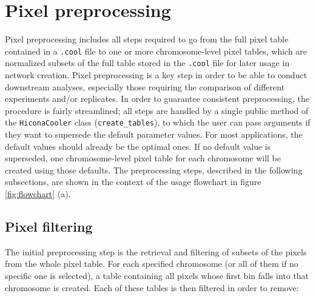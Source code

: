 \section{Pixel preprocessing}
Pixel preprocessing includes all steps required to go from the full pixel table contained in a \texttt{.cool} file to one or more chromosome-level pixel tables, which are normalized subsets of the full table stored in the \texttt{.cool} file for later usage in network creation.  
Pixel preprocessing is a key step in order to be able to conduct downstream analyses, especially those requiring the comparison of different experiments and/or replicates. In order to guarantee consistent preprocessing, the procedure is fairly streamlined; all steps are handled by a single public method of the \texttt{HiconaCooler} class (\texttt{create\_tables}), to which the user can pass arguments if they want to supersede the default parameter values. For most applications, the default values should already be the optimal ones. If no default value is superseded, one chromosome-level pixel table for each chromosome will be created using those defaults. The preprocessing steps, described in the following subsections, are shown in the context of the usage flowchart in figure \ref{fig:flowchart} (a).

\subsection{Pixel filtering}\label{par:pixfiltering}

The initial preprocessing step is the retrieval and filtering of subsets of the pixels from the whole pixel table. For each specified chromosome (or all of them if no specific one is selected), a table containing all pixels whose first bin falls into that chromosome is created. Each of these tables is then filtered in order to remove:

